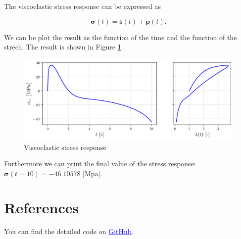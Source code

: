 \documentclass[12pt,a4paper]{article}
\begin{document}
\newpage

The viscoelastic stress response can be expressed as

\begin{equation}
    \boldsymbol{\sigma}(t) = \boldsymbol{s}(t) + \boldsymbol{p}(t).
\end{equation}

We can be plot the result as the function of the time and the function of the strech. The result is shown in Figure \ref{fig:stress}.

\begin{figure}[H]
    \centering
    \includegraphics[scale=0.8]{figures/stress.png}
    \caption{Viscoelastic stress response}
    \label{fig:stress}
\end{figure}

Furthermore we can print the final value of the stress response: $\boldsymbol{\sigma}(t=10) = -46.10578$ [Mpa].


\section*{References}

You can find the detailed code on \href{https://github.com/zsoca000/Finite-elastic-deformations-HW1/blob/main/solution2.ipynb}{\textcolor{blue}{\underline{GitHub}}}.
\end{document}
